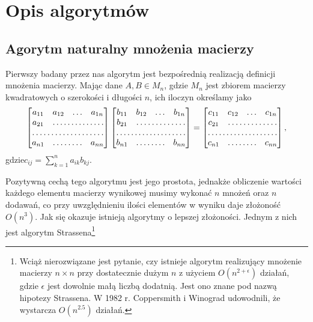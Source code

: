 \section{Opis algorytmów}
\subsection{Agorytm naturalny mnożenia macierzy}
Pierwszy badany przez nas algorytm jest bezpośrednią realizacją definicji
mnożenia macierzy. Mając dane $A,B \in M_{n}$, gdzie $M_{n}$ jest zbiorem
macierzy kwadratowych o szerokości i długości $n$, ich iloczyn określamy jako
$$ \begin{bmatrix}
a_{11} & a_{12} & \ldots & a_{1n} \\
a_{21} & \hdotsfor{3} \\
\hdotsfor{4}\\
a_{n1} & \hdotsfor{2} & a_{nn} \end{bmatrix}
\begin{bmatrix}
b_{11} & b_{12} & \ldots & b_{1n} \\
b_{21} & \hdotsfor{3} \\
\hdotsfor{4}\\
b_{n1} & \hdotsfor{2} & b_{nn} \end{bmatrix}=
\begin{bmatrix}
c_{11} & c_{12} & \ldots & c_{1n} \\
c_{21} & \hdotsfor{3} \\
\hdotsfor{4}\\
c_{n1} & \hdotsfor{2} & c_{nn} \end{bmatrix},
$$
gdzie$c_{ij}=\sum_{k=1}^{n} a_{ik}b_{kj}$. 

Pozytywną cechą tego algorytmu jest jego prostota, jednakże obliczenie wartości
każdego elementu macierzy wynikowej musimy wykonać $n$ mnożeń oraz $n$ dodawań,
co przy uwzględnieniu ilości elementów w wyniku daje złożoność $O(n^3)$.
Jak się okazuje istnieją algorytmy o lepszej złożoności. Jednym z nich jest
algorytm Strassena\footnote{Wciąż nierozwiązane jest pytanie, czy istnieje
algorytm realizujący mnożenie macierzy $n \times n$ przy dostatecznie dużym
$n$ z użyciem $O(n^{2+\epsilon})$ działań, gdzie $\epsilon$ jest dowolnie
małą liczbą dodatnią. Jest ono znane pod nazwą hipotezy Strassena.
W 1982 r. Coppersmith i Winograd udowodnili, że wystarcza $O(n^{2.5})$
działań.}
